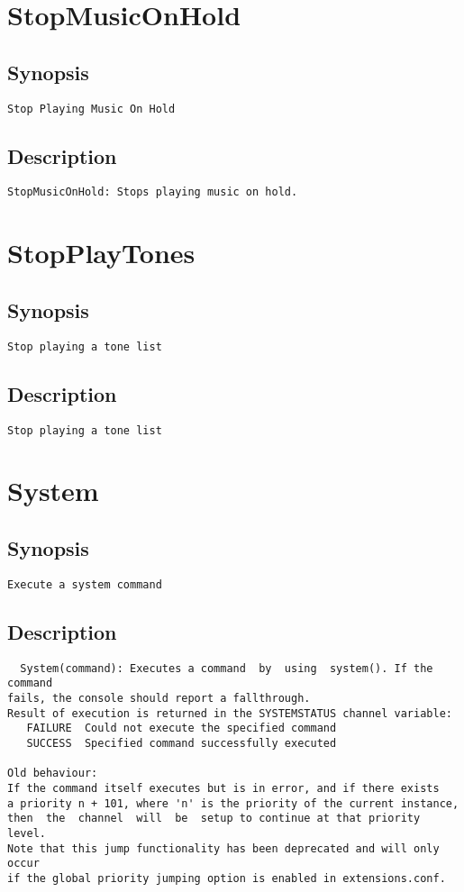 \section{StopMusicOnHold}
\subsection{Synopsis}
\begin{verbatim}
Stop Playing Music On Hold
\end{verbatim}
\subsection{Description}
\begin{verbatim}
StopMusicOnHold: Stops playing music on hold.

\end{verbatim}


\section{StopPlayTones}
\subsection{Synopsis}
\begin{verbatim}
Stop playing a tone list
\end{verbatim}
\subsection{Description}
\begin{verbatim}
Stop playing a tone list
\end{verbatim}


\section{System}
\subsection{Synopsis}
\begin{verbatim}
Execute a system command
\end{verbatim}
\subsection{Description}
\begin{verbatim}
  System(command): Executes a command  by  using  system(). If the command
fails, the console should report a fallthrough. 
Result of execution is returned in the SYSTEMSTATUS channel variable:
   FAILURE	Could not execute the specified command
   SUCCESS	Specified command successfully executed

Old behaviour:
If the command itself executes but is in error, and if there exists
a priority n + 101, where 'n' is the priority of the current instance,
then  the  channel  will  be  setup to continue at that priority level.
Note that this jump functionality has been deprecated and will only occur
if the global priority jumping option is enabled in extensions.conf.

\end{verbatim}


